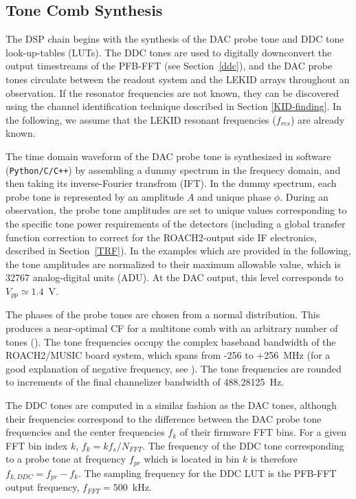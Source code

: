 \subsection{Tone Comb Synthesis}\label{tone comb}

The DSP chain begins with the synthesis of the DAC probe tone and DDC tone look-up-tables (LUTs). The DDC tones are used to digitally downconvert the output timestreams of the PFB-FFT (see Section~\ref{ddc}), and the DAC probe tones circulate between the readout system and the LEKID arrays throughout an observation. If the resonator frequencies are not known, they can be discovered using the channel identification technique described in Section \ref{KID-finding}. In the following, we assume that the LEKID resonant frequencies ($f_{res}$) are already known.

The time domain waveform of the DAC probe tone is synthesized in software (\texttt{Python/C/C++}) by assembling a dummy spectrum in the frequecy domain, and then taking its inverse-Fourier transfrom (IFT). In the dummy spectrum, each probe tone is represented by an amplitude $A$ and unique phase $\phi$. During an observation, the probe tone amplitudes are set to unique values corresponding to the specific tone power requirements of the detectors (including a global transfer function correction to correct for the ROACH2-output side IF electronics, described in Section~\ref{TRF}). In the examples which are provided in the following, the tone amplitudes are normalized to their maximum allowable value, which is 32767 analog-digital units (ADU). At the DAC output, this level corresponds to $V_{pp} \simeq 1.4$~V.

The phases of the probe tones are chosen from a normal distribution. This produces a near-optimal CF for a multitone comb with an arbitrary number of tones (\citet{boyd1986multitone}). The tone frequencies occupy the complex baseband bandwidth of the ROACH2/MUSIC board system, which spans from -256 to +256~MHz (for a good explanation of negative frequency, see \citet{lyons2004understanding}). The tone frequencies are rounded to increments of the final channelizer bandwidth of 488.28125~Hz.

The DDC tones are computed in a similar fashion as the DAC tones, although their frequencies correspond to the difference between the DAC probe tone frequencies and the center frequencies $f_{k}$ of their firmware FFT bins. For a given FFT bin index $k$, $f_{k} = kf_{s}/N_{FFT}$. The frequency of the DDC tone corresponding to a probe tone at frequency $f_{pr}$ which is located in bin $k$ is therefore $f_{k,DDC} = f_{pr} - f_{k}$. The sampling frequency for the DDC LUT is the PFB-FFT output frequency, $f_{FFT} = 500$~kHz.

